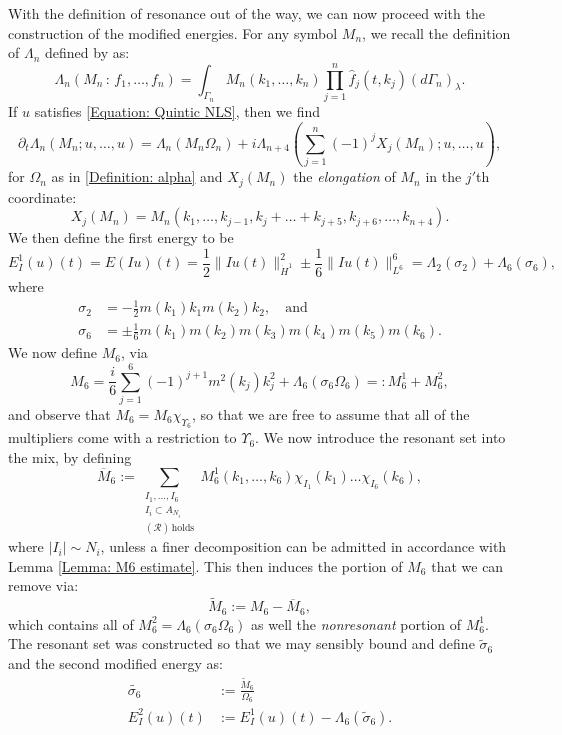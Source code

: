 \documentclass[12pt, letterpaper]{amsart}
\begin{document}
With the definition of resonance out of the way, we can now proceed with the construction of the modified energies. For any symbol $M_n$, we recall the definition of $\Lambda_n$ defined by \cite{de2007global} as:
\[
\Lambda_n(M_n\,:\,f_1,\dots, f_n) = \int_{\Gamma_n} M_n(k_1,\dots, k_n)\prod_{j=1}^n\widehat{f}_j(t,k_j)(d\Gamma_n)_\lambda.
\]
If $u$ satisfies \eqref{Equation: Quintic NLS}, then we find
\[
\partial_t\Lambda_n(M_n;u,\dots, u) = \Lambda_n(M_n\Omega_n) + i\Lambda_{n+4}\left(\sum_{j=1}^n(-1)^jX_j(M_n);u,\dots,u\right),
\]
for $\Omega_n$ as in \eqref{Definition: alpha} and $X_j(M_n)$ the \textit{elongation} of $M_n$ in the $j'$th coordinate:
\[
X_j(M_n) = M_n(k_1,\dots, k_{j-1},k_j+\dots +k_{j+5},k_{j+6},\dots, k_{n+4}).
\]
We then define the first energy to be 
\[
E^1_I(u)(t) = E(Iu)(t) = \frac{1}{2}\|Iu(t)\|_{\dot{H}^1}^2\pm\frac{1}{6}\|Iu(t)\|_{L^6}^6 = \Lambda_2(\sigma_2)+ \Lambda_6(\sigma_6),
\]
where
\begin{align*}
    \sigma_2 &= -\frac{1}{2}m(k_1)k_1m(k_2)k_2,\quad\mbox{and}\\
    \sigma_6 &= \pm\frac{1}{6}m(k_1)m(k_2)m(k_3)m(k_4)m(k_5)m(k_6).
\end{align*}
We now define $M_6$, via
\[
M_6 =  \frac{i}{6}\sum_{j=1}^6(-1)^{j+1}m^2(k_j)k_j^2 + \Lambda_6(\sigma_6\Omega_6) =: M^1_6 + M^2_6,
\]
and observe that $M_6 = M_6\chi_{\Upsilon_6}$, so that we are free to assume that all of the multipliers come with a restriction to $\Upsilon_6$. We now introduce the resonant set into the mix, by defining 
\[
\overline{M}_6 := \sum_{\substack{I_1,\dots, I_6\\I_i\subset A_{N_i}\\(\mathcal{R})\,\mathrm{ holds}}}M^1_6(k_1,\dots,k_6)\chi_{I_1}(k_1)\dots\chi_{I_6}(k_6),
\]
where $|I_i| \sim N_i$, unless a finer decomposition can be admitted in accordance with Lemma \ref{Lemma: M6 estimate}. This then induces the portion of $M_6$ that we can remove via:
\[
\tilde{M}_6 := M_6 - \overline{M}_6,
\]
which contains all of $M_6^2 = \Lambda_6(\sigma_6\Omega_6)$ as well the \textit{nonresonant} portion of $M_6^1$. The resonant set was constructed so that we may sensibly bound and define $\tilde{\sigma}_6$ and the second modified energy as:
\begin{align*}
    \tilde{\sigma_6} &:= \frac{\tilde{M}_6}{\Omega_6}\\
    E^2_I(u)(t) &:= E^1_I(u)(t) - \Lambda_6(\tilde{\sigma}_6).
\end{align*}
\end{document}
